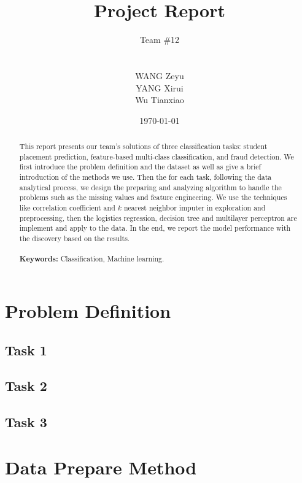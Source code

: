 \documentclass[11pt]{article}
\title{\Huge Project Report}
\author{
  \parbox{\textwidth}{
    \vspace{0.5cm}
    \centering \LARGE Team \#12
    \vspace{0.5cm}
  } \\
  \parbox{0.2\textwidth}{
    \centering WANG Zeyu
  }
  \parbox{0.2\textwidth}{
    \centering YANG Xirui
  }
  \parbox{0.2\textwidth}{
    \centering Wu Tianxiao
  }
}
\date{\today}
\begin{document}
\maketitle
\thispagestyle{empty}
\setcounter{page}{0}

\vspace{1cm}

\begin{abstract}
  This report presents our team's solutions of three classification tasks: student placement prediction, feature-based multi-class classification, and fraud detection. We first introduce the problem definition and the dataset as well as give a brief introduction of the methods we use. Then the for each task, following the data analytical process, we design the preparing and analyzing algorithm to handle the problems such as the missing values and feature engineering. We use the techniques like correlation coefficient and $k$ nearest neighbor imputer in exploration and preprocessing, then the logistics regression, decision tree and multilayer perceptron are implement and apply to the data. In the end, we report the model performance with the discovery based on the results.
  \\\\
  \textbf{Keywords:} Classification, Machine learning.
\end{abstract}

\newpage

\section{Problem Definition}

\subsection{Task 1}

\subsection{Task 2}

\subsection{Task 3}

\section{Data Prepare Method}
\end{document}
